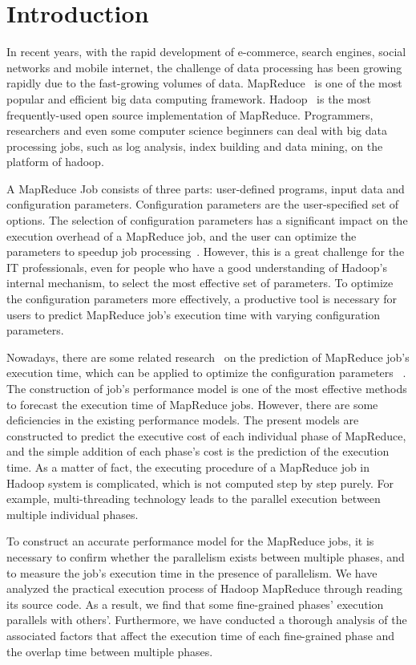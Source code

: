 \section{Introduction}
In recent years, with the rapid development of e-commerce, search engines, social networks and mobile internet,
the challenge of data processing has been growing rapidly due to the fast-growing volumes of data.
MapReduce~\cite{Dean2004MapReduce} is one of the most popular and efficient big data computing framework.
Hadoop~\cite{White2010Hadoop} is the most frequently-used open source implementation of MapReduce. 
Programmers, researchers and even some computer science beginners can deal with big data processing jobs, such as log analysis, index building and data mining, on the platform of hadoop.

A MapReduce Job consists of three parts: user-defined programs, input data and configuration parameters. Configuration parameters are the user-specified set of options. The selection of configuration parameters has a significant impact on the execution overhead of a MapReduce job, and the user can optimize the parameters to speedup job processing~\cite{Herodotou2011Profiling, Shi2014MRTuner, Li2014MRONLINE}. However, this is a great challenge for the IT professionals, even for people who have a good understanding of Hadoop's internal mechanism, to select the most effective set of parameters. To optimize the configuration parameters more effectively, a productive tool is necessary for users to predict MapReduce job's execution time with varying configuration parameters.

Nowadays, there are some related research~\cite{Herodotou2011Profiling, Shi2014MRTuner, Herodotou2011Hadoop} on the prediction of MapReduce job's execution time, which can be applied to optimize the configuration parameters ~\cite{Herodotou2011No}.  The construction of job's performance model is one of the most effective methods to forecast the execution time of MapReduce jobs. However, there are some deficiencies in the existing performance models. The present models are constructed to predict the executive cost of each individual phase of MapReduce, and the simple addition of each phase's cost is the prediction of the execution time. As a matter of fact, the executing procedure of a MapReduce job in Hadoop system is complicated, which is not computed step by step purely. For example, multi-threading technology leads to the parallel execution between multiple individual phases. 

 To construct an accurate performance model for the MapReduce jobs, it is necessary to confirm whether the parallelism exists between multiple phases, and to measure the job's execution time in the presence of parallelism. We have analyzed the practical execution process of Hadoop MapReduce through reading its source code. As a result, we find that some fine-grained phases' execution parallels with others'. Furthermore, we have conducted a thorough analysis of the associated factors that affect the execution time of each fine-grained phase and the overlap time between multiple phases.


